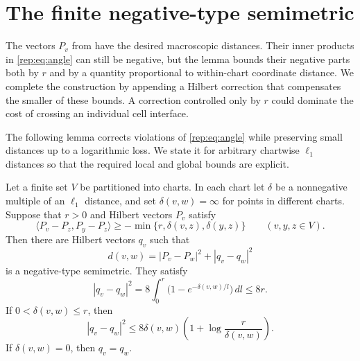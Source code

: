 \section{The finite negative-type semimetric}
\label{sec:repair}
\label{sec:metric}

The vectors $P_v$ from  have the desired macroscopic
distances. Their inner products in \eqref{rep:eq:angle} can still be
negative, but the lemma bounds their negative parts both by $r$ and
by a quantity proportional to within-chart coordinate distance.
We complete the construction by appending a Hilbert correction that
compensates the smaller of these bounds. A correction controlled only
by $r$ could dominate the cost of crossing an individual cell interface.

The following lemma corrects violations of \eqref{rep:eq:angle} while
preserving small distances up to a logarithmic loss. We state it for
arbitrary chartwise $\ell_1$ distances so that the required local and
global bounds are explicit.

\begin{lemma}\label{lem:repair}
Let a finite set $V$ be partitioned into charts. In each chart let
$\delta$ be a nonnegative multiple of an $\ell_1$ distance, and set
$\delta(v,w)=\infty$ for points in different charts.
Suppose that $r>0$ and Hilbert vectors $P_v$ satisfy
\begin{equation}\label{rep:eq:hypothesis}
\langle P_v-P_z,P_y-P_z\rangle
\ge-\min\{r,\delta(v,z),\delta(y,z)\}
\qquad(v,y,z\in V).
\end{equation}
Then there are Hilbert vectors $q_v$ such that
\[
d(v,w)=|P_v-P_w|^2+|q_v-q_w|^2
\]
is a negative-type semimetric. They satisfy
\begin{equation}\label{rep:eq:distance}
|q_v-q_w|^2
=8\int_0^r\bigl(1-e^{-\delta(v,w)/l}\bigr)\,dl\le8r.
\end{equation}
If $0<\delta(v,w)\le r$, then
\begin{equation}\label{rep:eq:local}
|q_v-q_w|^2
\le8\delta(v,w)\left(1+\log\frac r{\delta(v,w)}\right).
\end{equation}
If $\delta(v,w)=0$, then $q_v=q_w$.
\end{lemma}


